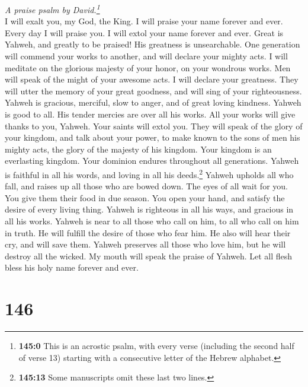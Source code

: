 \emph{A praise psalm by David.\footnote{\textbf{145:0} This is an
  acrostic psalm, with every verse (including the second half of verse
  13) starting with a consecutive letter of the Hebrew alphabet.}}\\
 I will exalt you, my God, the King. I will praise your
name forever and ever.  Every day I will praise you. I
will extol your name forever and ever.  Great is Yahweh,
and greatly to be praised! His greatness is unsearchable. 
One generation will commend your works to another, and will declare your
mighty acts.  I will meditate on the glorious majesty of
your honor, on your wondrous works.  Men will speak of the
might of your awesome acts. I will declare your greatness.
 They will utter the memory of your great goodness, and
will sing of your righteousness.  Yahweh is gracious,
merciful, slow to anger, and of great loving kindness. 
Yahweh is good to all. His tender mercies are over all his works.
 All your works will give thanks to you, Yahweh. Your
saints will extol you.  They will speak of the glory of
your kingdom, and talk about your power,  to make known
to the sons of men his mighty acts, the glory of the majesty of his
kingdom.  Your kingdom is an everlasting kingdom. Your
dominion endures throughout all generations. Yahweh is faithful in all
his words, and loving in all his deeds.\footnote{\textbf{145:13} Some
  manuscripts omit these last two lines.}  Yahweh upholds
all who fall, and raises up all those who are bowed down.
 The eyes of all wait for you. You give them their food
in due season.  You open your hand, and satisfy the
desire of every living thing.  Yahweh is righteous in all
his ways, and gracious in all his works.  Yahweh is near
to all those who call on him, to all who call on him in truth.
 He will fulfill the desire of those who fear him. He
also will hear their cry, and will save them.  Yahweh
preserves all those who love him, but he will destroy all the wicked.
 My mouth will speak the praise of Yahweh. Let all flesh
bless his holy name forever and ever.

\hypertarget{section-145}{%
\section{146}\label{section-145}}

